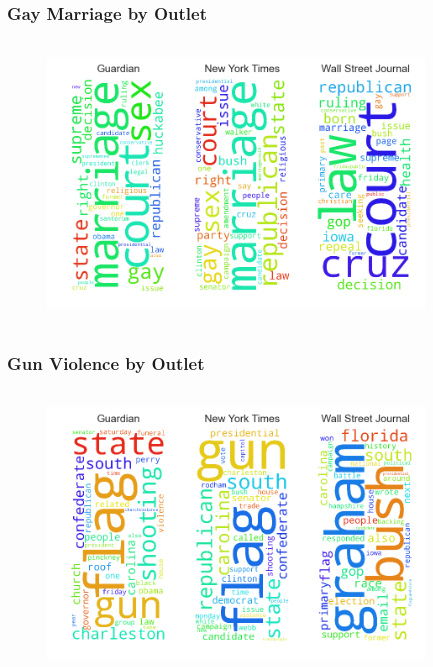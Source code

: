 \documentclass[11pt]{beamer}
\begin{document}

\begin{frame}
\frametitle{Gay Marriage by Outlet}

\begin{figure}
\centering
\includegraphics[width=100mm,height=75mm]{figures/source_within_topic9.png}
\end{figure} 

\end{frame}


\begin{frame}
\frametitle{Gun Violence by Outlet}

\begin{figure}
\centering
\includegraphics[width=100mm,height=75mm]{figures/source_within_topic12.png}
\end{figure} 

\end{frame}
\end{document}
